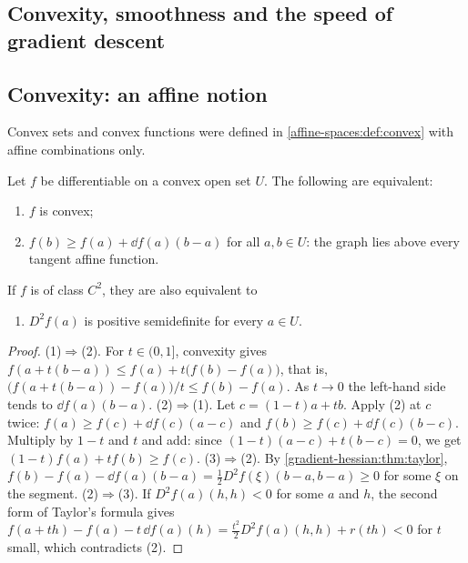 \begin{notechapter}
\section{Convexity, smoothness and the speed of gradient descent}
\label{gradient-hessian:sec:convex}

\subsection{Convexity: an affine notion}

Convex sets and convex functions were defined in
\cref{affine-spaces:def:convex} with affine combinations only.

\begin{theorem}
\label{gradient-hessian:thm:convex}
Let $f$ be differentiable on a convex open set $U$. The following are
equivalent:
\begin{enumerate}[nosep]
  \item $f$ is convex;
  \item $f(b)\geq f(a) + \dd f(a)(b - a)$ for all $a, b\in U$: the graph
        lies above every tangent affine function.
\end{enumerate}
If $f$ is of class $C^2$, they are also equivalent to
\begin{enumerate}
  \item $D^2f(a)$ is positive semidefinite for every $a\in U$.
\end{enumerate}
\end{theorem}

\begin{proof}
(1)$\Rightarrow$(2). For $t\in(0, 1]$, convexity gives
$f(a + t(b - a))\leq f(a) + t\bigl(f(b) - f(a)\bigr)$, that is,
$\bigl(f(a + t(b - a)) - f(a)\bigr)/t\leq f(b) - f(a)$. As $t\to0$ the
left-hand side tends to $\dd f(a)(b - a)$.
(2)$\Rightarrow$(1). Let $c = (1 - t)a + tb$. Apply (2) at $c$ twice:
$f(a)\geq f(c) + \dd f(c)(a - c)$ and
$f(b)\geq f(c) + \dd f(c)(b - c)$. Multiply by $1 - t$ and $t$ and add:
since $(1 - t)(a - c) + t(b - c) = 0$, we get
$(1 - t)f(a) + tf(b)\geq f(c)$.
(3)$\Rightarrow$(2). By \cref{gradient-hessian:thm:taylor},
$f(b) - f(a) - \dd f(a)(b - a) = \frac12D^2f(\xi)(b - a, b - a)\geq0$ for
some $\xi$ on the segment.
(2)$\Rightarrow$(3). If $D^2f(a)(h, h) < 0$ for some $a$ and $h$, the
second form of Taylor's formula gives
$f(a + th) - f(a) - t\,\dd f(a)(h) = \frac{t^2}2D^2f(a)(h, h) + r(th) < 0$
for $t$ small, which contradicts (2).
\end{proof}


\end{notechapter}
